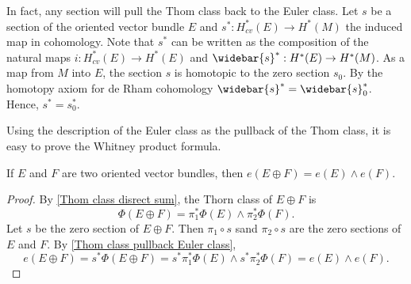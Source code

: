 \begin{remark}
In fact, any section will pull the Thom class back to the Euler class. Let $s$ be a section of the oriented vector bundle $E$ and $s^*:H_{cv}^*(E)\to H^*(M)$ the 
induced map in cohomology. Note that $s^*$ can be written as the composition of the natural maps $i:H^*_{cv}(E)\to H^*(E)$ and $\widebar{s}^*:H^*(E)\to H^*(M)$. 
As a map from $M$ into $E$, the section $s$ is homotopic to the zero section $s_0$. By the homotopy axiom for de Rham cohomology $\widebar{s}^*=\widebar{s}_0^*$. Hence, 
$s^*=s_0^*$.
\end{remark}
Using the description of the Euler class as the pullback of the Thom class, it is easy to prove the Whitney product formula.
\begin{proposition}
If $E$ and $F$ are two oriented vector bundles, then $e(E\oplus F)=e(E)\wedge e(F)$.
\end{proposition}
\begin{proof}
By \cref{Thom class disrect sum}, the Thorn class of $E\oplus F$ is
\[\Phi(E\oplus F)=\pi_1^*\Phi(E)\wedge\pi_2^*\Phi(F).\]
Let $s$ be the zero section of $E\oplus F$. Then $\pi_1\circ s$ sand $\pi_2\circ s$ are the zero sections of $E$ and $F$. By \cref{Thom class pullback Euler class},
\[e(E\oplus F)=s^*\Phi(E\oplus F)=s^*\pi_1^*\Phi(E)\wedge s^*\pi_2^*\Phi(F)=e(E)\wedge e(F).\]
\end{proof}
